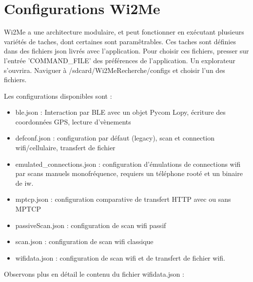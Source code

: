 \documentclass[11pt]{article}
\newcommand\mtext[2]{#1}
\newcommand\mtext[2]{#2}
\begin{document}
\begin{figure}
\end{figure}

\newpage

\section{\mtext{Configurations Wi2Me}{Wi2Me Configurations}}\label{sec:jsonconf}

\mtext{Wi2Me a une architecture modulaire, et peut fonctionner en exécutant
plusieurs variétés de taches, dont certaines sont paramêtrables. Ces taches sont
définies dans des fichiers json livrés avec l'application. Pour choisir ces
fichiers, presser sur l'entrée 'COMMAND\_FILE' des préférences de l'application.
Un explorateur s'ouvrira.  Naviguer à /sdcard/Wi2MeRecherche/configs et choisir
l'un des fichiers.

Les configurations  disponibles sont :
\begin{itemize}
\item ble.json : Interaction par BLE avec un objet Pycom Lopy, écriture des
coordonnées GPS, lecture d'vènements
\item defconf.json : configuration par défaut (legacy), scan et connection
wifi/cellulaire, transfert de fichier
\item emulated\_connections.json : configuration d'émulations de connections
wifi par scans manuels monofréquence, requiers un téléphone rooté et un binaire
de iw.
\item mptcp.json : configuration comparative de transfert HTTP avec ou sans
MPTCP
\item passiveScan.json : configuration de scan wifi passif
\item scan.json : configuration de scan wifi classique
\item wifidata.json : configuration de scan wifi et de transfert de fichier
wifi.
\end{itemize}

Observons plus en détail le contenu du fichier wifidata.json :
}{}
\end{document}
